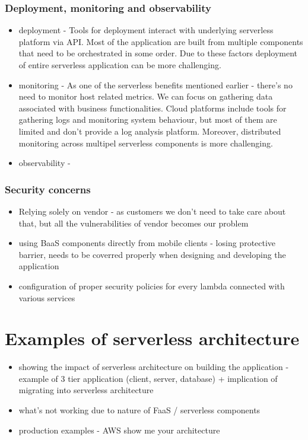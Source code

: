 \subsubsection*{Deployment, monitoring and observability}

\begin{itemize}
    \item deployment - Tools for deployment interact with underlying serverless platform via API. Most of the application are built from multiple components that need to be orchestrated in some order. Due to these factors deployment of entire serverless application can be more challenging.
    \item monitoring - As one of the serverless benefits mentioned earlier - there's no need to monitor host related metrics. We can focus on gathering data associated with business functionalities. Cloud platforms include tools for gathering logs and monitoring system behaviour, but most of them are limited and don't provide a log analysis platform. Moreover, distributed monitoring across multipel serverless components is more challenging. 
    \item observability - 
\end{itemize}

\subsubsection*{Security concerns}

\begin{itemize}
    \item Relying solely on vendor - as customers we don't need to take care about that, but all the vulnerabilities of vendor becomes our problem
    \item using BaaS components directly from mobile clients - losing protective barrier, needs to be coverred properly when designing and developing the application
    \item configuration of proper security policies for every lambda connected with various services
\end{itemize}

\section*{Examples of serverless architecture}

\begin{itemize}
    \item showing the impact of serverless architecture on building the application - example of 3 tier application (client, server, database) + implication of migrating into serverless architecture
    \item what's not working due to nature of FaaS / serverless components
    \item production examples - AWS show me your architecture
\end{itemize}

